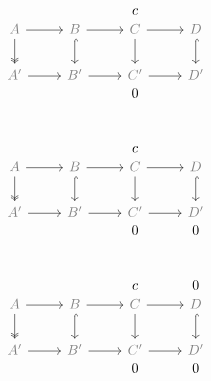 \documentclass[12pt]{article}
\begin{document}
\begin{equation*}
  \begin{tikzcd}
    \phantom{a} & \phantom{b_2} & \phantom {0} \\[-2em]
    &\phantom{b_1} & c  &\phantom 0 \\[-2em]
    \color{gray}A\rar\dar[two heads] & \color{gray}B\rar\dar[hook] & \color{gray}C\rar\dar & \color{gray}D\dar[hook] \\
    \color{gray}A'\rar &\color{gray} B'\rar &\color{gray} C'\rar &\color{gray} D' \\[-2em]
    &\phantom{b'} & 0 & \phantom 0
  \end{tikzcd}
\end{equation*}

\begin{equation*}
  \begin{tikzcd}
    \phantom{a} & \phantom{b_2} &  \\[-2em]
    & \phantom{b_1}& c  &\phantom 0\\[-2em]
    \color{gray}A\rar\dar[two heads] & \color{gray}B\rar\dar[hook] & \color{gray}C\rar\dar & \color{gray}D\dar[hook] \\
    \color{gray}A'\rar &\color{gray} B'\rar &\color{gray} C'\rar &\color{gray} D' \\[-2em]
    &\phantom{b'} & 0 & 0
  \end{tikzcd}
\end{equation*}

\begin{equation*}
  \begin{tikzcd}
    \phantom{a} & \phantom{b_2} &  \\[-2em]
    & \phantom{b_1}& c  & 0\\[-2em]
    \color{gray}A\rar\dar[two heads] & \color{gray}B\rar\dar[hook] & \color{gray}C\rar\dar & \color{gray}D\dar[hook, black] \\
    \color{gray}A'\rar &\color{gray} B'\rar &\color{gray} C'\rar &\color{gray} D' \\[-2em]
    &\phantom{b'} & 0 & 0
  \end{tikzcd}
\end{equation*}
\end{document}
